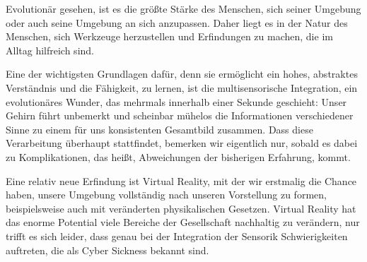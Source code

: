 Evolution\"ar gesehen, ist es die gr\"o{\ss}te St\"arke des Menschen, sich seiner Umgebung oder auch seine Umgebung an sich anzupassen. Daher liegt es in der Natur des Menschen, sich Werkzeuge herzustellen und Erfindungen zu machen, die im Alltag hilfreich sind.

Eine der wichtigsten Grundlagen daf\"ur, denn sie erm\"oglicht ein hohes, abstraktes Verst\"andnis und die F\"ahigkeit, zu lernen, ist die multisensorische Integration, ein evolution\"ares Wunder, das mehrmals innerhalb einer Sekunde geschieht: Unser Gehirn f\"uhrt unbemerkt und scheinbar m\"uhelos die Informationen verschiedener Sinne zu einem f\"ur uns konsistenten Gesamtbild zusammen.
Dass diese Verarbeitung \"uberhaupt stattfindet, bemerken wir eigentlich nur, sobald es dabei zu Komplikationen, das hei{\ss}t, Abweichungen der bisherigen Erfahrung, kommt. 

Eine relativ neue Erfindung ist Virtual Reality, mit der wir erstmalig die Chance haben, unsere Umgebung vollst\"andig nach unseren Vorstellung zu formen, beispielsweise auch mit ver\"anderten physikalischen Gesetzen.
Virtual Reality hat das enorme Potential viele Bereiche der Gesellschaft nachhaltig zu ver\"andern, nur trifft es sich leider, dass genau bei der Integration der Sensorik Schwierigkeiten auftreten, die als Cyber Sickness bekannt sind.